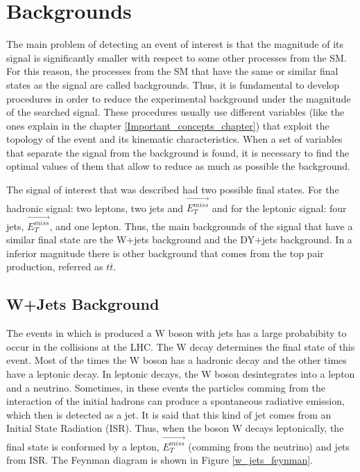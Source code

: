  
 \section{Backgrounds}
 
The main problem of detecting an event of interest is that the magnitude of its signal is significantly smaller with respect to some other processes from the SM. For this reason, the processes from the
SM that have the same or similar final states as the signal are called backgrounds. Thus, it is fundamental to develop procedures in order to reduce the experimental background under the magnitude 
of the searched signal. These procedures usually use different variables (like the ones explain in the chapter \ref{Important_concepts_chapter}) that exploit the topology of the event and its 
kinematic characteristics. When a set of variables that separate the signal from the background is found, it is necessary to find the optimal values of them that allow to reduce as much as possible 
the background. 
 
The signal of interest that was described had two possible final states. For the hadronic signal: two leptons, two jets and $\vec{E_T^{miss}}$ and for the leptonic signal: four jets, 
$\vec{E_T^{miss}}$, and one lepton. Thus, the main backgrounds of the signal that have a similar final state are the W+jets background and the DY+jets background. In a inferior magnitude there
is other background that comes from the top pair production, referred as $t\overline{t}$.

 
\subsection{W+Jets Background}
  
The events in which is produced a W boson with jets has a large probabibity to occur in the collisions at the LHC. The W decay determines the final state of this event. Most of the times the W boson
has a hadronic decay and the other times have a leptonic decay. In leptonic decays, the W boson desintegrates into a lepton and a neutrino. Sometimes, in these events the particles 
comming from the interaction of the initial hadrons can produce a spontaneous radiative emission, which then is detected as a jet. It is said that this kind of jet comes from an Initial State 
Radiation (ISR). Thus, when the boson W decays leptonically, the final state is conformed by a lepton, $\vec{E_T^{miss}}$ (comming from the neutrino) and jets from ISR. The Feynman diagram is shown 
in Figure \ref{w_jets_feynman}.
  
